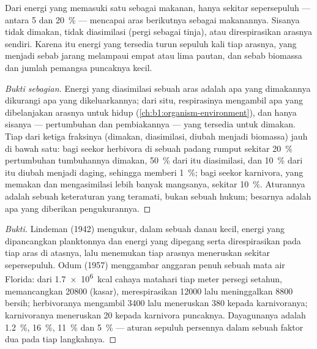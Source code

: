 \begin{theorem}\label{thm:b1:ecosystem-organization:lindeman}
Dari energi yang memasuki satu  sebagai makanan, hanya
sekitar sepersepuluh --- antara \qty{5}{} dan \qty{20}{\%} --- mencapai
aras berikutnya sebagai makanannya. Sisanya tidak dimakan, tidak
diasimilasi (pergi sebagai tinja), atau direspirasikan arasnya
sendiri. Karena itu energi yang tersedia turun sepuluh kali tiap
arasnya, yang menjadi sebab  jarang melampaui empat atau
lima pautan, dan sebab biomassa dan jumlah pemangsa puncaknya kecil.
\end{theorem}
\begin{proof}[Bukti sebagian]
Energi yang diasimilasi sebuah aras adalah apa yang dimakannya
dikurangi apa yang dikeluarkannya; dari situ, respirasinya mengambil
apa yang dibelanjakan arasnya untuk hidup
(\cref{ch:b1:organism-environment}), dan hanya sisanya --- pertumbuhan
dan pembiakannya --- yang tersedia untuk dimakan. Tiap dari ketiga
fraksinya (dimakan, diasimilasi, diubah menjadi biomassa) jauh di
bawah satu: bagi seekor herbivora di sebuah padang rumput sekitar
\qty{20}{\%} pertumbuhan tumbuhannya dimakan, \qty{50}{\%} dari itu
diasimilasi, dan \qty{10}{\%} dari itu diubah menjadi daging, sehingga
memberi \qty{1}{\%}; bagi seekor karnivora, yang memakan dan
mengasimilasi lebih banyak mangsanya, sekitar \qty{10}{\%}. Aturannya
adalah sebuah keteraturan yang teramati, bukan sebuah hukum;
besarnya adalah apa yang diberikan pengukurannya.
\end{proof}
\begin{proof}[Bukti]
Lindeman (1942) mengukur, dalam sebuah danau kecil, energi yang
dipancangkan planktonnya dan energi yang dipegang serta
direspirasikan pada tiap aras di atasnya, lalu menemukan tiap arasnya
meneruskan sekitar sepersepuluh. Odum (1957) menggambar anggaran penuh
sebuah mata air Florida: dari \qty{1.7e6}{kcal} cahaya matahari tiap
meter persegi setahun,  memancangkan \num{20800} (kasar),
merespirasikan \num{12000} lalu meninggalkan \num{8800} bersih;
herbivoranya mengambil \num{3400} lalu meneruskan \num{380} kepada
karnivoranya; karnivoranya meneruskan \num{20} kepada karnivora
puncaknya. Dayagunanya adalah \qty{1.2}{\%}, \qty{16}{\%},
\qty{11}{\%} dan \qty{5}{\%} --- aturan sepuluh persennya dalam sebuah
faktor dua pada tiap langkahnya.
\end{proof}

